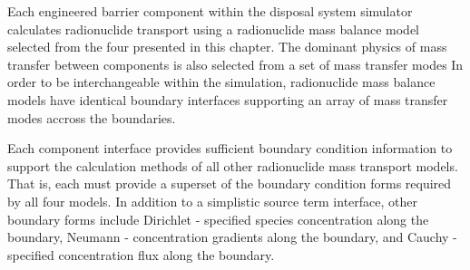 Each engineered barrier component within the \Cyder disposal system simulator 
calculates radionuclide transport using a radionuclide mass balance model 
selected from the four presented in this chapter. The dominant physics of mass 
transfer between components is also selected from a set of mass transfer modes 
In order to be interchangeable within the simulation, radionuclide mass balance 
models have identical boundary interfaces supporting an array of mass transfer 
modes accross the boundaries.

Each component interface provides sufficient boundary condition information to 
support the calculation methods of all other radionuclide mass transport models. That 
is, each must provide a superset of the boundary condition forms required by all 
four models. In addition to a simplistic source term interface, other 
boundary forms include Dirichlet - specified species concentration along the 
boundary, Neumann - concentration gradients along the boundary, and Cauchy - 
specified concentration flux along the boundary.
